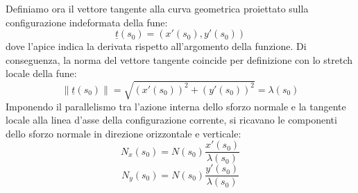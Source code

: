Definiamo ora il vettore tangente alla curva geometrica proiettato sulla configurazione indeformata della fune:
\begin{equation}
   \underline{t}(s_0) = \left( x'(s_0), y'(s_0) \right)
\end{equation} 
dove l'apice indica la derivata rispetto all'argomento della funzione. Di conseguenza, la norma del vettore tangente coincide per definizione con lo stretch locale della fune:
\begin{equation}
   \|\underline{t}(s_0)\| = \sqrt{(x'(s_0))^2 + (y'(s_0))^2} = \lambda(s_0)
\end{equation}
Imponendo il parallelismo tra l'azione interna dello sforzo normale e la tangente locale alla linea d'asse della configurazione corrente, si ricavano le componenti dello sforzo normale in direzione orizzontale e verticale:
\begin{equation}
   N_x(s_0) = N(s_0) \frac{x'(s_0)}{\lambda(s_0)}
\end{equation}
\begin{equation}
   N_y(s_0) = N(s_0) \frac{y'(s_0)}{\lambda(s_0)}
\end{equation}

